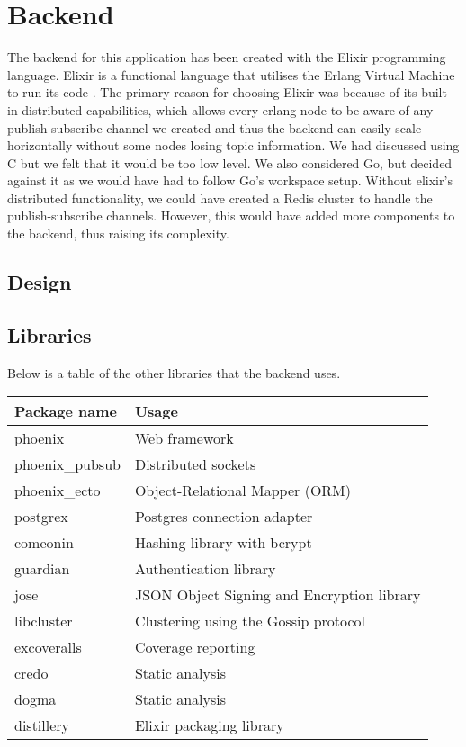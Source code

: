 \documentclass[11pt,a4paper]{report}
\begin{document}
\section{Backend}

The backend for this application has been created with the Elixir programming language. Elixir is a functional language that utilises the Erlang Virtual Machine to run its code \cite{website:elixir_homepage}. The primary reason for choosing Elixir was because of its built-in distributed capabilities, which allows every erlang node to be aware of any publish-subscribe channel we created and thus the backend can easily scale horizontally without some nodes losing topic information. We had discussed using C but we felt that it would be too low level. We also considered Go, but decided against it as we would have had to follow Go's workspace setup.  Without elixir's distributed functionality, we could have created a Redis cluster to handle the publish-subscribe channels. However, this would have added more components to the backend, thus raising its complexity.


\subsection{Design}


\subsection{Libraries}

Below is a table of the other libraries that the backend uses.

\begin{tabular}{ | l | l |}
  \hline
  Package name & Usage \\
  \hline
  phoenix & Web framework \\
  phoenix\_pubsub & Distributed sockets \\
  phoenix\_ecto & Object-Relational Mapper (ORM) \\
  \hline
  postgrex & Postgres connection adapter \\
  comeonin & Hashing library with bcrypt \\
  guardian & Authentication library \\
  jose & JSON Object Signing and Encryption library \\
  libcluster & Clustering using the Gossip protocol \\
  \hline
  excoveralls & Coverage reporting \\
  credo & Static analysis \\
  dogma & Static analysis \\
  distillery & Elixir packaging library \\
  \hline
\end{tabular}
\end{document}
